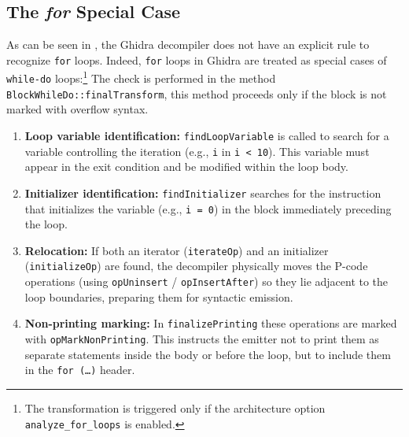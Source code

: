 \subsection{The \emph{for} Special Case}
As can be seen in , the Ghidra decompiler does not have an explicit rule to recognize \texttt{for} loops. 
Indeed, \texttt{for} loops in Ghidra are treated as special cases of \texttt{while-do} loops:\footnote{The transformation is triggered only if the architecture option \texttt{analyze\_for\_loops} is enabled.}
The check is performed in the method \texttt{BlockWhileDo::finalTransform}, this method proceeds only if the block is not marked with overflow syntax.
\begin{enumerate}
    \item \textbf{Loop variable identification:} \texttt{findLoopVariable} is called to search for a variable controlling the iteration (e.g., \texttt{i} in \texttt{i < 10}). 
    This variable must appear in the exit condition and be modified within the loop body.
    \item \textbf{Initializer identification:} \texttt{findInitializer} searches for the instruction that initializes the variable (e.g., \texttt{i = 0}) 
    in the block immediately preceding the loop.
    \item \textbf{Relocation:} If both an iterator (\texttt{iterateOp}) and an initializer (\texttt{initializeOp}) are found, 
    the decompiler physically moves the P-code operations (using \texttt{opUninsert} / \texttt{opInsertAfter}) so they lie adjacent to the loop boundaries, 
    preparing them for syntactic emission.
    \item \textbf{Non-printing marking:} In \texttt{finalizePrinting} these operations are marked with \texttt{opMarkNonPrinting}. 
    This instructs the emitter not to print them as separate statements inside the body or before the loop, but to include them in the \texttt{for (\ldots)} header.
\end{enumerate}


